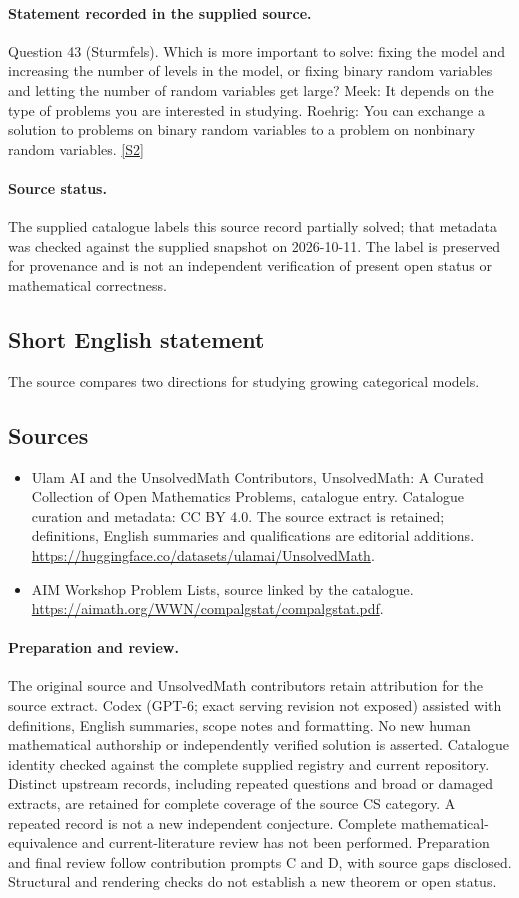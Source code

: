 \documentclass[11pt]{article}
\begin{document}
\paragraph{Statement recorded in the supplied source.}
Question 43 (Sturmfels). Which is more important to solve: fixing the model and increasing the number of levels in the model, or fixing binary random variables and letting the number of random variables get large? Meek: It depends on the type of problems you are interested in studying. Roehrig: You can exchange a solution to problems on binary random variables to a problem on nonbinary random variables. \href{https://aimath.org/WWN/compalgstat/compalgstat.pdf}{[S2]}
\paragraph{Source status.}
The supplied catalogue labels this source record partially solved; that metadata was checked against the supplied snapshot on 2026-10-11. The label is preserved for provenance and is not an independent verification of present open status or mathematical correctness.
\subsection{Short English statement}
The source compares two directions for studying growing categorical models.
\subsection{Sources}
\begin{itemize}
\item[S1] Ulam AI and the UnsolvedMath Contributors, UnsolvedMath: A Curated Collection of Open Mathematics Problems, catalogue entry. Catalogue curation and metadata: CC BY 4.0. The source extract is retained; definitions, English summaries and qualifications are editorial additions.
\url{https://huggingface.co/datasets/ulamai/UnsolvedMath}.
\item[S2] AIM Workshop Problem Lists, source linked by the catalogue.
\url{https://aimath.org/WWN/compalgstat/compalgstat.pdf}.
\end{itemize}
\paragraph{Preparation and review.}
The original source and UnsolvedMath contributors retain attribution for the source extract. Codex (GPT-6; exact serving revision not exposed) assisted with definitions, English summaries, scope notes and formatting. No new human mathematical authorship or independently verified solution is asserted. Catalogue identity checked against the complete supplied registry and current repository. Distinct upstream records, including repeated questions and broad or damaged extracts, are retained for complete coverage of the source CS category. A repeated record is not a new independent conjecture. Complete mathematical-equivalence and current-literature review has not been performed. Preparation and final review follow contribution prompts C and D, with source gaps disclosed. Structural and rendering checks do not establish a new theorem or open status.
\label{end:statement}
\end{document}
